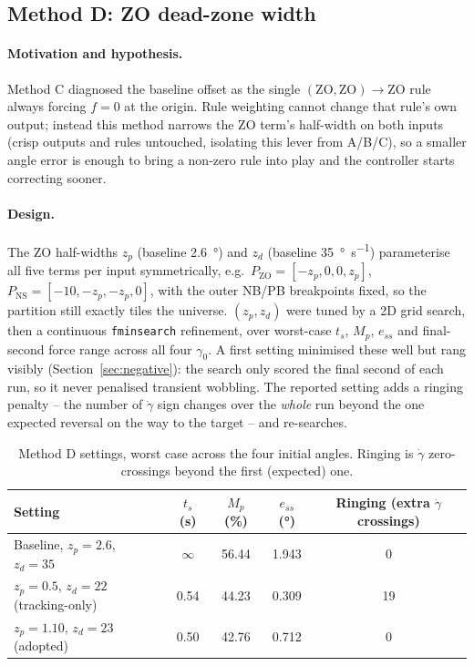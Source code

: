 \documentclass[11pt,a4paper]{article}
\newcommand{\gam}{\ensuremath{\gamma}}
\newcommand{\gamdot}{\ensuremath{\dot{\gamma}}}
\newcommand{\ts}{\ensuremath{t_s}}
\newcommand{\overshoot}{\ensuremath{M_p}}
\newcommand{\sse}{\ensuremath{e_{ss}}}
\begin{document}
\subsection{Method D: ZO dead-zone width}
\label{sec:method-d}

\paragraph{Motivation and hypothesis.}
Method C diagnosed the baseline offset as the single
$(\mathrm{ZO},\mathrm{ZO})\to\mathrm{ZO}$ rule always forcing $f=0$ at the
origin. Rule weighting cannot change that rule's own output; instead this
method narrows the ZO term's half-width on both inputs (crisp outputs and
rules untouched, isolating this lever from A/B/C), so a smaller angle error
is enough to bring a non-zero rule into play and the controller starts
correcting sooner.

\paragraph{Design.}
The ZO half-widths $z_p$ (baseline \SI{2.6}{\degree}) and $z_d$ (baseline
\SI{35}{\degree\per\s}) parameterise all five terms per input symmetrically,
e.g.\ $P_{\mathrm{ZO}}=[-z_p,0,0,z_p]$, $P_{\mathrm{NS}}=[-10,-z_p,-z_p,0]$,
with the outer NB/PB breakpoints fixed, so the partition still exactly tiles
the universe. $(z_p,z_d)$ were tuned by a 2D grid search, then a continuous
\texttt{fminsearch} refinement, over worst-case $\ts$, $\overshoot$, $\sse$
and final-second force range across all four $\gam_0$. A first setting
minimised these well but rang visibly (Section~\ref{sec:negative}): the
search only scored the final second of each run, so it never penalised
transient wobbling. The reported setting adds a ringing penalty -- the
number of $\gamdot$ sign changes over the \emph{whole} run beyond the one
expected reversal on the way to the target -- and re-searches.

\begin{table}[H]
\centering
\small
\begin{tabular}{@{}lcccc@{}}
\toprule
Setting & $\ts$ (\si{\s}) & $\overshoot$ (\si{\%}) & $\sse$ (\si{\degree}) & Ringing (extra $\gamdot$ crossings) \\
\midrule
Baseline, $z_p=2.6$, $z_d=35$ & $\infty$ & 56.44 & 1.943 & 0 \\
$z_p=0.5$, $z_d=22$ (tracking-only) & 0.54 & 44.23 & 0.309 & 19 \\
$z_p=1.10$, $z_d=23$ (adopted) & 0.50 & 42.76 & 0.712 & 0 \\
\bottomrule
\end{tabular}
\caption{Method D settings, worst case across the four initial angles.
Ringing is $\gamdot$ zero-crossings beyond the first (expected) one.}
\label{tab:method-d}
\end{table}
\end{document}
